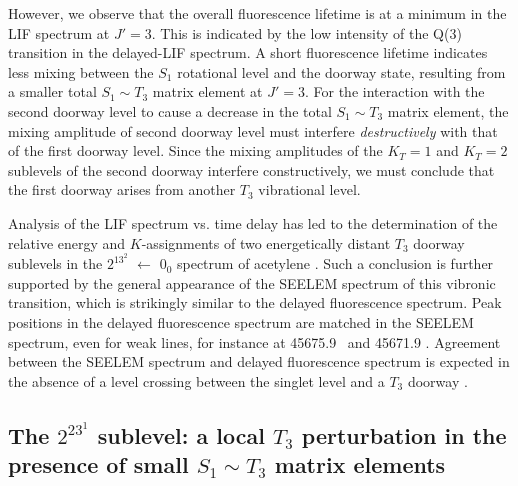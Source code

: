 \documentclass[12pt]{mitthesis}
\begin{document}
However, we observe that the overall fluorescence lifetime is at a
minimum in the LIF spectrum at $J'=3$.  This is indicated by the low
intensity of the Q(3) transition in the delayed-LIF spectrum.  A short
fluorescence lifetime indicates less mixing between the $S_1$
rotational level and the doorway state, resulting from a smaller total
$S_1 \sim T_3$ matrix element at $J'=3$.  For the interaction with the
second doorway level to cause a decrease in the total $S_1 \sim T_3$
matrix element, the mixing amplitude of second doorway level must
interfere \emph{destructively} with that of the first doorway level.
Since the mixing amplitudes of the $K_T=1$ and $K_T=2$ sublevels of
the second doorway interfere constructively, we must conclude that the
first doorway arises from another $T_3$ vibrational level.

Analysis of the LIF spectrum vs. time delay has led to the
determination of the relative energy and $K$-assignments of two
energetically distant $T_3$ doorway sublevels in the $2^13^2$ 
$\leftarrow$ $0_0$ spectrum of acetylene \astate.  Such a conclusion
is further supported by the general appearance of the SEELEM spectrum
of this vibronic transition, which is strikingly similar to the
delayed fluorescence spectrum.  Peak positions in the delayed
fluorescence spectrum are matched in the SEELEM spectrum, even for
weak lines, for instance at 45675.9 \rcm\ and 45671.9 \rcm.  Agreement
between the SEELEM spectrum and delayed fluorescence spectrum is
expected in the absence of a level crossing between the singlet level
and a $T_3$ doorway \cite{altunata01}.


\subsection{The $2^23^1$  sublevel: a local $T_3$
  perturbation in the presence of small $S_1 \sim T_3$ matrix
  elements}


\end{document}
